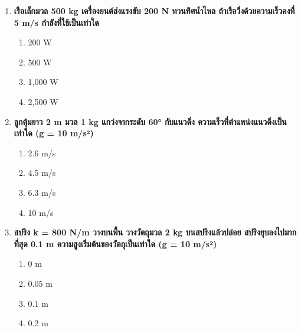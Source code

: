 \documentclass[12pt]{article}
\begin{document}
\begin{enumerate}
\begin{enumerate}[label=\alph*)]
\item 1,800 J
\item 3,600 J
\item 7,200 J
\item 1,800,000 J
\end{enumerate}
\item \textbf{เรือเล็กมวล 500 kg เครื่องยนต์ส่งแรงขับ 200 N ทวนทิศน้ำไหล ถ้าเรือวิ่งด้วยความเร็วคงที่ 5 m/s กำลังที่ใช้เป็นเท่าใด}
\begin{enumerate}[label=\alph*)]
\item 200 W
\item 500 W
\item 1,000 W
\item 2,500 W
\end{enumerate}
\item \textbf{ลูกตุ้มยาว 2 m มวล 1 kg แกว่งจากระดับ 60° กับแนวดิ่ง ความเร็วที่ตำแหน่งแนวดิ่งเป็นเท่าใด (g = 10 m/s²)}
\begin{enumerate}[label=\alph*)]
\item 2.6 m/s
\item 4.5 m/s
\item 6.3 m/s
\item 10 m/s
\end{enumerate}
\item \textbf{สปริง k = 800 N/m วางบนพื้น วางวัตถุมวล 2 kg บนสปริงแล้วปล่อย สปริงยุบลงไปมากที่สุด 0.1 m ความสูงเริ่มต้นของวัตถุเป็นเท่าใด (g = 10 m/s²)}
\begin{enumerate}[label=\alph*)]
\item 0 m
\item 0.05 m
\item 0.1 m
\item 0.2 m
\end{enumerate}
\end{enumerate}
\end{document}
